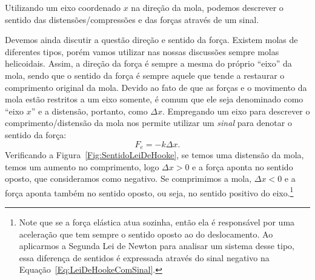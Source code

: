 \begin{marginfigure}[-4cm]
\caption{Utilizando um eixo coordenado $x$ na direção da mola, podemos descrever o sentido das distensões/compressões e das forças através de um sinal.\label{Fig:SentidoLeiDeHooke}}
\end{marginfigure}

Devemos ainda discutir a questão direção e sentido da força. Existem molas de diferentes tipos, porém vamos utilizar nas nossas discussões sempre molas helicoidais. Assim, a direção da força é sempre a mesma do próprio ``eixo'' da mola, sendo que o sentido da força é sempre aquele que tende a restaurar o comprimento original da mola. Devido ao fato de que as forças e o movimento da mola estão restritos a um eixo somente, é comum que ele seja denominado como ``eixo $x$'' e a distensão, portanto, como $\Delta x$. Empregando um eixo para descrever o comprimento/distensão da mola nos permite utilizar um \emph{sinal} para denotar o sentido da força:
\begin{equation}\label{Eq:LeiDeHookeComSinal}
    F_e = - k\Delta x.
\end{equation} 
%
Verificando a Figura~\eqref{Fig:SentidoLeiDeHooke}, se temos uma distensão da mola, temos um aumento no comprimento, logo $\Delta x > 0$ e a força aponta no sentido oposto, que consideramos como negativo. Se comprimimos a mola, $\Delta x < 0$ e a força aponta também no sentido oposto, ou seja, no sentido positivo do eixo.\footnote{Note que se a força elástica atua sozinha, então ela é responsável por uma aceleração que tem sempre o sentido oposto ao do deslocamento. Ao aplicarmos a Segunda Lei de Newton para analisar um sistema desse tipo, essa diferença de sentidos é expressada através do sinal negativo na Equação~\eqref{Eq:LeiDeHookeComSinal}.}

